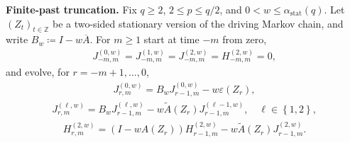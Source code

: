 \textbf{Finite-past truncation.} Fix \(q \ge 2\), \(2 \le p \le q / 2\), and
\(0 < w \le \alpha_{\text{stat}}(q)\). Let \((Z_t)_{t \in \mathbb{Z}}\) be a two-sided stationary
version of the driving Markov chain, and write \(B_w \coloneqq I - w \overline{A}\).
For \(m \ge 1\) start at time \(-m\) from zero,
\begin{equation}
\begin{aligned}
J_{-m,m}^{(0,w)} = J_{-m,m}^{(1,w)} = J_{-m,m}^{(2,w)}
  = H_{-m,m}^{(2,w)} = 0,
\end{aligned}
\end{equation}
and evolve, for \(r = -m + 1, \dots, 0\),
\begin{equation}
\begin{aligned}
J_{r,m}^{(0,w)}
  = B_w J_{r - 1,m}^{(0,w)} - w \varepsilon(Z_r),
\end{aligned}
\end{equation}
\begin{equation}
\begin{aligned}
J_{r,m}^{(\ell,w)}
  = B_w J_{r - 1,m}^{(\ell,w)}
    - w \widetilde{A}(Z_r) J_{r - 1,m}^{(\ell - 1,w)},
\quad \ell \in \left\{1, 2\right\},
\end{aligned}
\end{equation}
\begin{equation}
\begin{aligned}
H_{r,m}^{(2,w)}
  = (I - w A(Z_r)) H_{r - 1,m}^{(2,w)}
    - w \widetilde{A}(Z_r) J_{r - 1,m}^{(2,w)}.
\end{aligned}
\end{equation}
